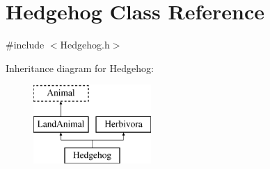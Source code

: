 \hypertarget{classHedgehog}{\section{Hedgehog Class Reference}
\label{classHedgehog}
}


{\ttfamily \#include $<$Hedgehog.\-h$>$}

Inheritance diagram for Hedgehog\-:\begin{figure}[H]
\begin{center}
\leavevmode
\includegraphics[height=3.000000cm]{classHedgehog}
\end{center}
\end{figure}
